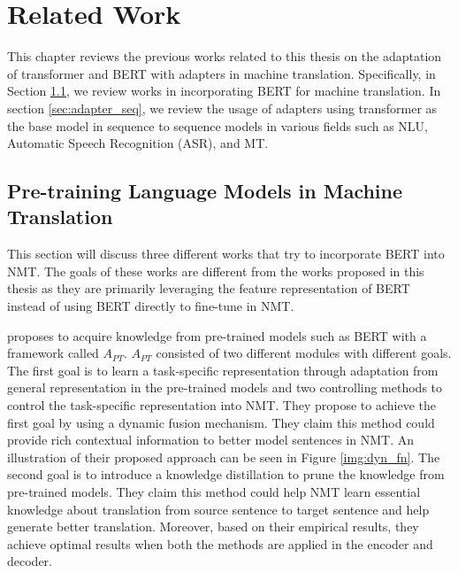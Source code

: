 \chapter{Related Work}

This chapter reviews the previous works related to this thesis on the adaptation of transformer and BERT with adapters in machine translation. Specifically, in Section \ref{sec:prelm_mt}, we review works in incorporating BERT for machine translation. In section \ref{sec:adapter_seq}, we review the usage of adapters using transformer as the base model in sequence to sequence models in various fields such as NLU, Automatic Speech Recognition (ASR), and MT.

\section{Pre-training Language Models in Machine Translation}
\label{sec:prelm_mt}

This section will discuss three different works that try to incorporate BERT into NMT. The goals of these works are different from the works proposed in this thesis as they are primarily leveraging the feature representation of BERT instead of using BERT directly to fine-tune in NMT.

\cite{weng2020acquiring} proposes to acquire knowledge from pre-trained models such as BERT with a framework called $A_{PT}$. $A_{PT}$ consisted of two different modules with different goals. The first goal is to learn a task-specific representation through adaptation from general representation in the pre-trained models and two controlling methods to control the task-specific representation into NMT. They propose to achieve the first goal by using a dynamic fusion mechanism. They claim this method could provide rich contextual information to better model sentences in NMT. An illustration of their proposed approach can be seen in Figure \ref{img:dyn_fn}. The second goal is to introduce a knowledge distillation to prune the knowledge from pre-trained models. They claim this method could help NMT learn essential knowledge about translation from source sentence to target sentence and help generate better translation. Moreover, based on their empirical results, they achieve optimal results when both the methods are applied in the encoder and decoder.

